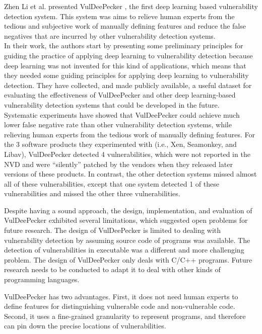 Zhen Li et al. presented VulDeePecker \cite{Zhen_Li2018}, the first deep learning based vulnerability detection system. This system was aims to relieve human experts from the tedious and subjective work of manually defining features and reduce the false negatives that are incurred by other vulnerability detection systems.\\ 

In their work, the authors start by presenting some preliminary principles for guiding the practice of applying deep learning to vulnerability detection because deep learning was not invented for this kind of applications, which means that they needed some guiding principles for applying deep learning to vulnerability detection. They have collected, and made publicly available, a useful dataset for evaluating the effectiveness of VulDeePecker and other deep learning-based vulnerability detection systems that could be developed in the future. \\

Systematic experiments have showed that VulDeePecker could achieve much lower false negative rate than other vulnerability detection systems, while relieving human experts from the tedious work of manually defining features. For the 3 software products they experimented with (i.e., Xen, Seamonkey, and Libav), VulDeePecker detected 4 vulnerabilities, which were not reported in the NVD and were “silently” patched by the vendors when they released later versions of these products. In contrast, the other detection systems missed almost all of these vulnerabilities, except that one system detected 1 of these vulnerabilities and missed the other three vulnerabilities.

Despite having a sound approach, the design, implementation, and evaluation of VulDeePecker exhibited several limitations, which suggested open problems for future research. The design of VulDeePecker is limited to dealing with vulnerability detection by assuming source code of programs was available. The detection of vulnerabilities in executable was a different and more challenging problem. The design of VulDeePecker only deals
with C/C++ programs. Future research needs to be conducted to adapt it to deal with other kinds of programming languages. 

VulDeePecker has two advantages. First, it does not need human experts to define features for distinguishing vulnerable code and non-vulnerable code. Second, it uses a fine-grained granularity to represent programs, and therefore can pin down the precise locations of vulnerabilities.




